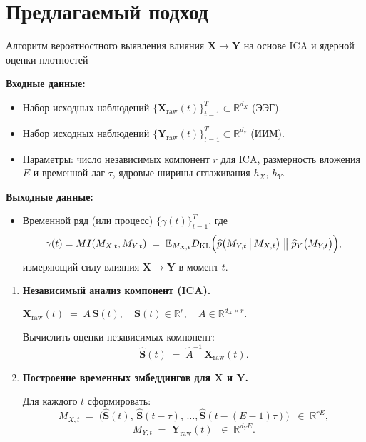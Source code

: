 \documentclass[a4paper, 12pt]{article}
\begin{document}
	\section{Предлагаемый подход}
	\begin{algorithm}[h!]
		\caption{Алгоритм вероятностного выявления влияния $\mathbf{X}\to\mathbf{Y}$ на основе ICA и ядерной оценки плотностей}
		\label{alg:ICA_KDE_Causal}
		
		\textbf{Входные данные:}
		\begin{itemize}
			\item Набор исходных наблюдений $\{\mathbf{X}_{\mathrm{raw}}(t)\}_{t=1}^T \subset \mathbb{R}^{d_X}$ (ЭЭГ).
			\item Набор исходных наблюдений $\{\mathbf{Y}_{\mathrm{raw}}(t)\}_{t=1}^T \subset \mathbb{R}^{d_Y}$ (ИИМ).
			\item Параметры: число независимых компонент $r$ для ICA, размерность вложения $E$ и временной лаг $\tau$, ядровые ширины сглаживания $h_X,\,h_Y$.
		\end{itemize}
		
		\textbf{Выходные данные:}
		\begin{itemize}
			\item Временной ряд (или процесс) $\{\gamma(t)\}_{t=1}^T$, где
			\[
			\gamma(t) = MI(M_{X, t}, M_{Y, t}) 
			\;=\; 
			\mathbb{E}_{M_{X, t}} D_{\mathrm{KL}}\Bigl(
			\widehat{p}\bigl(M_{Y,t}\,\big\vert\,M_{X,t}\bigr)
			\;\big\|\;
			\widehat{p}_{Y}\bigl(M_{Y,t}\bigr)
			\Bigr),
			\]
			измеряющий силу влияния $\mathbf{X}\to\mathbf{Y}$ в момент $t$.
		\end{itemize}
		
		\begin{enumerate}
			\item \textbf{Независимый анализ компонент (ICA).} 
			
			\(\displaystyle
			\mathbf{X}_{\mathrm{raw}}(t) \;=\; A\,\mathbf{S}(t),
			\quad
			\mathbf{S}(t)\in \mathbb{R}^{r}, 
			\quad
			A\in\mathbb{R}^{d_X \times r}.
			\)
			
			Вычислить оценки независимых компонент:
			\[
			\widehat{\mathbf{S}}(t)
			\;=\;
			\widehat{A}^{-1}\,
			\mathbf{X}_{\mathrm{raw}}(t).
			\]
			
			\item \textbf{Построение временных эмбеддингов для \(\mathbf{X}\) и \(\mathbf{Y}\).}
			
			Для каждого $t$ сформировать:
			\[
			M_{X,t}
			\;=\;
			\bigl(\widehat{\mathbf{S}}(t),\,\widehat{\mathbf{S}}(t-\tau),\,\dots,\widehat{\mathbf{S}}(t-(E-1)\tau)\bigr)
			\;\;\in\;\mathbb{R}^{rE},
			\]
			\[
			M_{Y,t}
			\;=\;
			\mathbf{Y}_{\mathrm{raw}}(t)
			\;\;\in\;\mathbb{R}^{d_Y E}.
			\]
			

\end{enumerate}
\end{algorithm}
\end{document}
